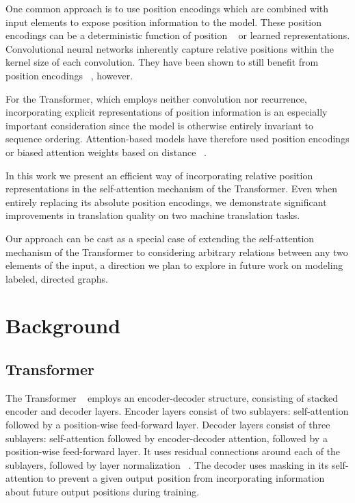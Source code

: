 \documentclass[11pt,a4paper]{article}
\begin{document}
One common approach is to use position encodings which are combined with input elements to expose position information to the model. These position encodings can be a deterministic function of position ~\cite{sukhbaatar2015, vaswani2017} or learned representations. Convolutional neural networks inherently capture relative positions within the kernel size of each convolution. They have been shown to still benefit from position encodings ~\cite{gehring2017}, however.

For the Transformer, which employs neither convolution nor recurrence, incorporating explicit representations of position information is an especially important consideration since the model is otherwise entirely invariant to sequence ordering. Attention-based models have therefore used position encodings or biased attention weights based on distance ~\cite{parikh2016}.

In this work we present an efficient way of incorporating relative position representations in the self-attention mechanism of the Transformer. Even when entirely replacing its absolute position encodings, we demonstrate significant improvements in translation quality on two machine translation tasks.

Our approach can be cast as a special case of extending the self-attention mechanism of the Transformer to considering arbitrary relations between any two elements of the input, a direction we plan to explore in future work on modeling labeled, directed graphs.


\section{Background}

\subsection{Transformer}

The Transformer ~\cite{vaswani2017} employs an encoder-decoder structure, consisting of stacked encoder and decoder layers.
Encoder layers consist of two sublayers: self-attention followed by a position-wise feed-forward layer.
Decoder layers consist of three sublayers: self-attention followed by encoder-decoder attention, followed by a position-wise feed-forward layer.
It uses residual connections around each of the sublayers, followed by layer normalization ~\cite{ba2016}. The decoder uses masking in its self-attention to prevent a given output position from incorporating information about future output positions during training.
\end{document}
